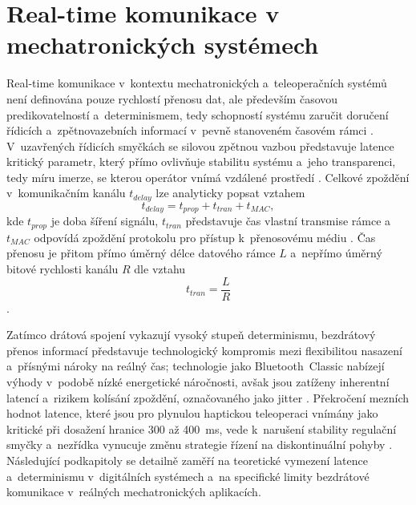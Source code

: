 \section{Real-time komunikace v mechatronických systémech}
Real-time komunikace v~kontextu mechatronických a~teleoperačních systémů není definována pouze rychlostí přenosu dat, ale především časovou predikovatelností a~determinismem, tedy schopností systému zaručit doručení řídicích a~zpětnovazebních informací v~pevně stanoveném časovém rámci \cite{Aijaz2018, Kos2018, Bolarinwa2022}.
V~uzavřených řídicích smyčkách se silovou zpětnou vazbou představuje latence kritický parametr, který přímo ovlivňuje stabilitu systému a~jeho transparenci, tedy míru imerze, se kterou operátor vnímá vzdálené prostředí \cite{Suman2025, Aijaz2018, Bolarinwa2022, Patel2022, Black2025}.
Celkové zpoždění v~komunikačním kanálu $t_{delay}$ lze analyticky popsat vztahem
%
\begin{equation}
    t_{delay} = t_{prop} + t_{tran} + t_{MAC},
\end{equation}
%
kde $t_{prop}$ je doba šíření signálu, $t_{tran}$ představuje čas vlastní transmise rámce a~$t_{MAC}$ odpovídá zpoždění protokolu pro přístup k~přenosovému médiu \cite{Kos2018}.
Čas přenosu je přitom přímo úměrný délce datového rámce $L$ a~nepřímo úměrný bitové rychlosti kanálu $R$ dle vztahu
%
\begin{equation}
    t_{tran} = \frac{L}{R}
\end{equation}
%
\cite{Kos2018}.

Zatímco drátová spojení vykazují vysoký stupeň determinismu, bezdrátový přenos informací představuje technologický kompromis mezi flexibilitou nasazení a~přísnými nároky na reálný čas; technologie jako Bluetooth~Classic nabízejí výhody v~podobě nízké energetické náročnosti, avšak jsou zatíženy inherentní latencí a~rizikem kolísání zpoždění, označovaného jako jitter \cite{Aijaz2018, Eridani2021918, Bolarinwa2022, Suman2025}.
Překročení mezních hodnot latence, které jsou pro plynulou haptickou teleoperaci vnímány jako kritické při dosažení hranice 300 až 400~ms, vede k~narušení stability regulační smyčky a~nezřídka vynucuje změnu strategie řízení na diskontinuální pohyby \cite{Bolarinwa2022, Suman2025, Aijaz2018, AlSaadi2023313, Almeida202098}.
Následující podkapitoly se detailně zaměří na teoretické vymezení latence a~determinismu v~digitálních systémech a~na specifické limity bezdrátové komunikace v~reálných mechatronických aplikacích.
